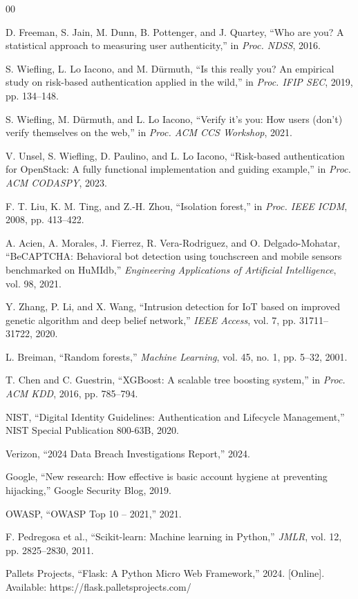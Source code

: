 \documentclass[conference]{IEEEtran}
\begin{document}

\begin{thebibliography}{00}

D. Freeman, S. Jain, M. Dunn, B. Pottenger, and J. Quartey, ``Who are you? A statistical approach to measuring user authenticity,'' in \textit{Proc. NDSS}, 2016.

S. Wiefling, L. Lo Iacono, and M. D{\"u}rmuth, ``Is this really you? An empirical study on risk-based authentication applied in the wild,'' in \textit{Proc. IFIP SEC}, 2019, pp. 134--148.

S. Wiefling, M. D{\"u}rmuth, and L. Lo Iacono, ``Verify it's you: How users (don't) verify themselves on the web,'' in \textit{Proc. ACM CCS Workshop}, 2021.

V. Unsel, S. Wiefling, D. Paulino, and L. Lo Iacono, ``Risk-based authentication for OpenStack: A fully functional implementation and guiding example,'' in \textit{Proc. ACM CODASPY}, 2023.

F. T. Liu, K. M. Ting, and Z.-H. Zhou, ``Isolation forest,'' in \textit{Proc. IEEE ICDM}, 2008, pp. 413--422.

A. Acien, A. Morales, J. Fierrez, R. Vera-Rodriguez, and O. Delgado-Mohatar, ``BeCAPTCHA: Behavioral bot detection using touchscreen and mobile sensors benchmarked on HuMIdb,'' \textit{Engineering Applications of Artificial Intelligence}, vol. 98, 2021.

Y. Zhang, P. Li, and X. Wang, ``Intrusion detection for IoT based on improved genetic algorithm and deep belief network,'' \textit{IEEE Access}, vol. 7, pp. 31711--31722, 2020.

L. Breiman, ``Random forests,'' \textit{Machine Learning}, vol. 45, no. 1, pp. 5--32, 2001.

T. Chen and C. Guestrin, ``XGBoost: A scalable tree boosting system,'' in \textit{Proc. ACM KDD}, 2016, pp. 785--794.

NIST, ``Digital Identity Guidelines: Authentication and Lifecycle Management,'' NIST Special Publication 800-63B, 2020.

Verizon, ``2024 Data Breach Investigations Report,'' 2024.

Google, ``New research: How effective is basic account hygiene at preventing hijacking,'' Google Security Blog, 2019.

OWASP, ``OWASP Top 10 -- 2021,'' 2021.

F. Pedregosa et al., ``Scikit-learn: Machine learning in Python,'' \textit{JMLR}, vol. 12, pp. 2825--2830, 2011.

Pallets Projects, ``Flask: A Python Micro Web Framework,'' 2024. [Online]. Available: https://flask.palletsprojects.com/

\end{thebibliography}
\end{document}
